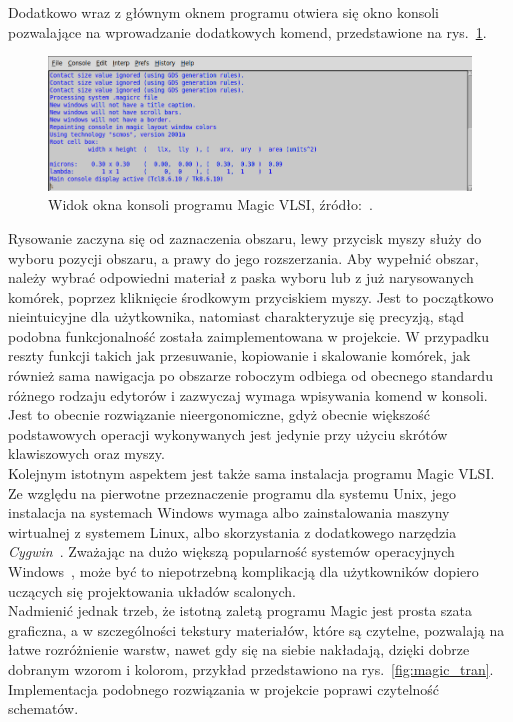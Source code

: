 \indent Dodatkowo wraz z głównym oknem programu otwiera się okno konsoli pozwalające na wprowadzanie dodatkowych komend,
przedstawione na rys.~\ref{fig:magic_konsola}.

\begin{figure}[h]
    \centering
    \includegraphics[width=.9\textwidth]{chapters/chapter2/img/magic_okno_konsola}
    \caption[Widok okna konsoli programu Magic VLSI.]{Widok okna konsoli programu Magic VLSI, źródło:~\cite{MAGIC_site}.}
    \label{fig:magic_konsola}
\end{figure}

\indent Rysowanie zaczyna się od zaznaczenia obszaru, lewy przycisk myszy służy do wyboru pozycji obszaru,
a prawy do jego rozszerzania.
Aby wypełnić obszar, należy wybrać odpowiedni materiał z paska wyboru
lub z już narysowanych komórek,
poprzez kliknięcie środkowym przyciskiem myszy.
Jest to początkowo nieintuicyjne dla użytkownika,
natomiast charakteryzuje się precyzją, stąd podobna funkcjonalność została zaimplementowana w projekcie.
W przypadku reszty funkcji takich jak przesuwanie, kopiowanie i skalowanie komórek,
jak również sama nawigacja po obszarze roboczym odbiega od obecnego standardu różnego rodzaju edytorów
i zazwyczaj wymaga wpisywania komend w konsoli.
Jest to obecnie rozwiązanie nieergonomiczne, gdyż obecnie większość podstawowych operacji wykonywanych jest
jedynie przy użyciu skrótów klawiszowych oraz myszy.\\
\indent Kolejnym istotnym aspektem jest także sama instalacja programu Magic VLSI\@.
Ze względu na pierwotne przeznaczenie programu dla systemu Unix,
jego instalacja na systemach Windows wymaga albo zainstalowania maszyny wirtualnej z systemem Linux,
albo skorzystania z dodatkowego narzędzia \textit{Cygwin}~\cite{MAGIC_site,cygwin}.
Zważając na dużo większą popularność systemów operacyjnych Windows~\cite{os_stats},
może być to niepotrzebną komplikacją dla użytkowników dopiero uczących się projektowania układów scalonych.\\
\indent Nadmienić jednak trzeb, że istotną zaletą programu Magic jest prosta szata graficzna,
a w szczególności tekstury materiałów, które są czytelne, pozwalają na łatwe rozróżnienie warstw,
nawet gdy się na siebie nakładają, dzięki dobrze dobranym wzorom i kolorom,
przykład przedstawiono na rys.~\ref{fig:magic_tran}.
Implementacja podobnego rozwiązania w projekcie poprawi czytelność schematów.

